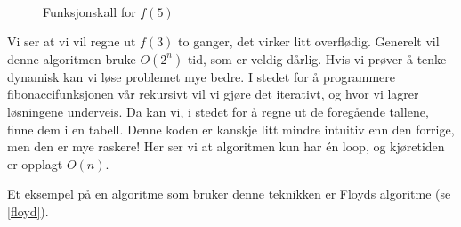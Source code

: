 \begin{figure}[H]
\caption{Funksjonskall for $ f(5) $}
\label{fig:fib_rekursivt}
\centering
~\\
\end{figure}

Vi ser at vi vil regne ut $ f(3) $ to ganger, det virker litt overflødig. Generelt vil denne algoritmen bruke $ O(2^n) $ tid, som er veldig dårlig. Hvis vi prøver å tenke dynamisk kan vi løse problemet mye bedre. I stedet for å programmere fibonaccifunksjonen vår rekursivt vil vi gjøre det iterativt, og hvor vi lagrer løsningene underveis. Da kan vi, i stedet for å regne ut de foregående tallene, finne dem i en tabell. 
Denne koden er kanskje litt mindre intuitiv enn den forrige, men den er mye raskere! Her ser vi at algoritmen kun har én loop, og kjøretiden er opplagt $ O(n) $.

Et eksempel på en algoritme som bruker denne teknikken er Floyds algoritme (se \ref{floyd}).